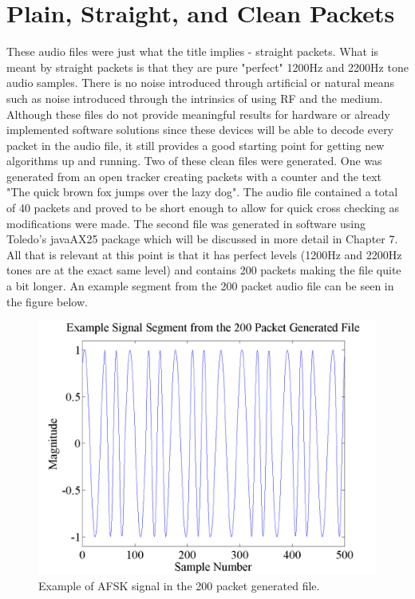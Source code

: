 \section{Plain, Straight, and Clean Packets}
These audio files were just what the title implies - straight packets. What is meant by straight packets is that they are pure "perfect" 1200Hz and 2200Hz tone audio samples. There is no noise introduced through artificial or natural means such as noise introduced through the intrinsics of using RF and the medium. Although these files do not provide meaningful results for hardware or already implemented software solutions since these devices will be able to decode every packet in the audio file, it still provides a good starting point for getting new algorithms up and running. Two of these clean files were generated. One was generated from an open tracker creating packets with a counter and the text "The quick brown fox jumps over the lazy dog". The audio file contained a total of 40 packets and proved to be short enough to allow for quick cross checking as modifications were made. The second file was generated in software using Toledo's javaAX25 package which will be discussed in more detail in Chapter 7. All that is relevant at this point is that it has perfect levels (1200Hz and 2200Hz tones are at the exact same level) and contains 200 packets making the file quite a bit longer. An example segment from the 200 packet audio file can be seen in the figure below.
\begin{figure}
  \centering
	\includegraphics[width=0.75\linewidth]{images/Examplesignalsegmentfromthe200packetgeneratedfile.png} 
	\caption{Example of AFSK signal in the 200 packet generated file.}
\end{figure}


